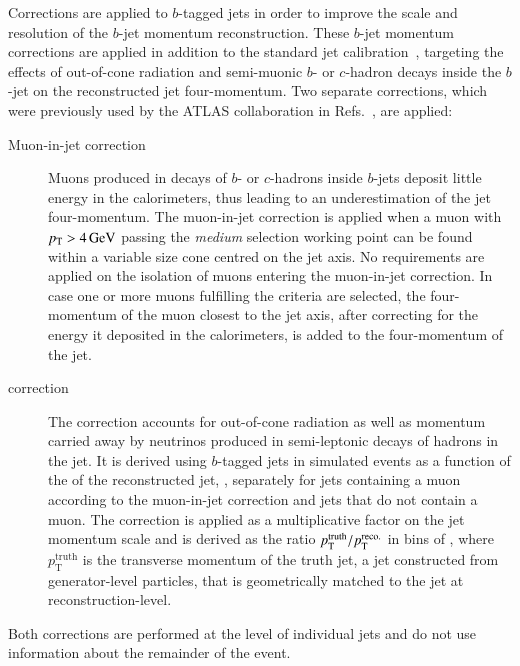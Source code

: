 Corrections are applied to $b$-tagged jets in order to improve the scale and
resolution of the $b$-jet momentum reconstruction.
These $b$-jet momentum corrections are applied in addition to the standard jet
calibration~\cite{JETM-2018-05}, targeting the effects of out-of-cone radiation
and semi-muonic $b$- or $c$-hadron decays inside the $b$-jet on the
reconstructed jet four-momentum. Two separate corrections, which were previously
used by the ATLAS collaboration in
Refs.~\cite{HIGG-2016-29,HIGG-2018-04,HIGG-2018-51}, are applied:
\begin{description}

\item[Muon-in-jet correction] Muons produced in decays of $b$- or $c$-hadrons
  inside $b$-jets deposit little energy in the calorimeters, thus leading to an
  underestimation of the jet four-momentum. The muon-in-jet correction is
  applied when a muon with $\pT > \SI{4}{\GeV}$ passing the \emph{medium}
  selection working point can be found within a variable size cone centred on
  the jet axis.
  No requirements are applied on the isolation of muons entering the muon-in-jet
  correction. In case one or more muons fulfilling the criteria are selected,
  the four-momentum of the muon closest to the jet axis, after correcting for
  the energy it deposited in the calorimeters, is added to the four-momentum of
  the jet.

\item[\pTreco correction] The \pTreco correction accounts for out-of-cone
  radiation as well as momentum carried away by neutrinos produced in
  semi-leptonic decays of hadrons in the jet. It is derived using $b$-tagged
  jets in simulated \ttbar events as a function of the \pT of the reconstructed
  jet, \pTreco, separately for jets containing a muon according to the
  muon-in-jet correction and jets that do not contain a muon. The correction is
  applied as a multiplicative factor on the jet momentum scale and is derived as
  the ratio $p_{\text{T}}^{\text{truth}} / p_{\text{T}}^{\text{reco.}}$ in bins of \pTreco, where
  $p_{\text{T}}^{\text{truth}}$ is the transverse momentum of the truth jet, a
  jet constructed from generator-level particles, that is geometrically matched
  to the jet at reconstruction-level.

\end{description}
Both corrections are performed at the level of individual jets and do not use
information about the remainder of the event.

